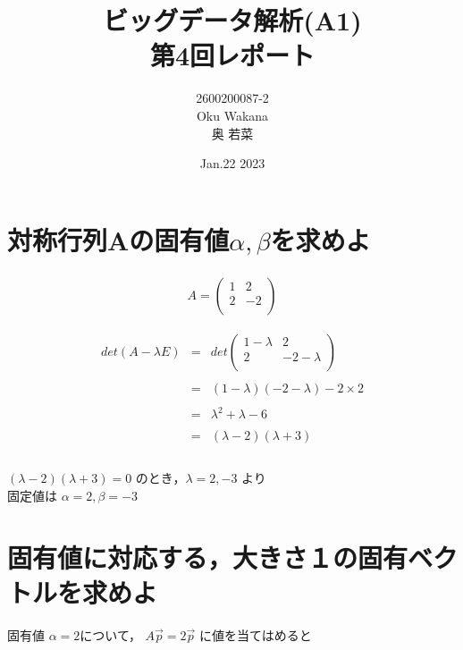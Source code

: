 \documentclass[dvipdfmx,autodetect-engine,titlepage]{jsarticle}
\title{ビッグデータ解析(A1)\\
第4回レポート\\
}
\author{2600200087-2\\Oku Wakana\\奥 若菜}
\date{Jan.22 2023}
\begin{document}
\maketitle

\section{対称行列Aの固有値\begin{math}\alpha ,\beta \end{math}を求めよ}
\begin{eqnarray*}
  A =
\begin{pmatrix}
  1 & 2 \\
  2 & -2 \\
\end{pmatrix}
\end{eqnarray*}

\begin{eqnarray*}
det(A -\lambda E) 
&=& det 
\begin{pmatrix}
  1-\lambda  & 2 \\
  2 & -2-\lambda  \\
\end{pmatrix} \\\\
&=& (1-\lambda )(-2-\lambda )-2 \times 2 \\\\
&=& \lambda ^2 + \lambda  - 6 \\\\
&=& (\lambda -2)(\lambda +3) \\\\
\end{eqnarray*}

\begin{math}
  (\lambda -2)(\lambda +3) = 0
\end{math}
のとき，\begin{math}
  \lambda = 2,-3 
\end{math} より　\\

固定値は \begin{math}
  \alpha = 2, \beta = -3
 \end{math} \\


\section{固有値に対応する，大きさ１の固有ベクトルを求めよ}
固有値 \begin{math}
  \alpha = 2
\end{math}について，
\begin{math}
A \overrightarrow{p} = 2 \overrightarrow{p} 
\end{math} に値を当てはめると
\end{document}
